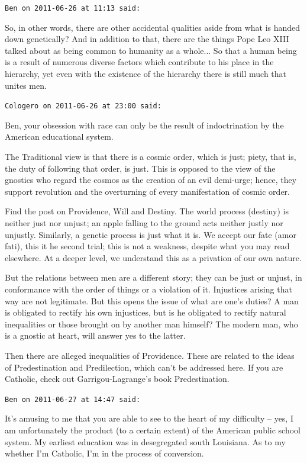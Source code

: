 \begin{footnotesize}
\begin{sffamily}
\texttt{Ben on 2011-06-26 at 11:13 said:}

So, in other words, there are other accidental qualities aside from what is handed down genetically? And in addition to that, there are the things Pope Leo XIII talked about as being common to humanity as a whole... So that a human being is a result of numerous diverse factors which contribute to his place in the hierarchy, yet even with the existence of the hierarchy there is still much that unites men.

\hfill

\texttt{Cologero on 2011-06-26 at 23:00 said:}

Ben, your obsession with race can only be the result of indoctrination by the American educational system.

The Traditional view is that there is a cosmic order, which is just; piety, that is, the duty of following that order, is just. This is opposed to the view of the gnostics who regard the cosmos as the creation of an evil demi-urge; hence, they support revolution and the overturning of every manifestation of cosmic order.

Find the post on Providence, Will and Destiny. The world process (destiny) is neither just nor unjust; an apple falling to the ground acts neither justly nor unjustly. Similarly, a genetic process is just what it is. We accept our fate (amor fati), this it he second trial; this is not a weakness, despite what you may read elsewhere. At a deeper level, we understand this as a privation of our own nature.

But the relations between men are a different story; they can be just or unjust, in conformance with the order of things or a violation of it. Injustices arising that way are not legitimate. But this opens the issue of what are one's duties? A man is obligated to rectify his own injustices, but is he obligated to rectify natural inequalities or those brought on by another man himself? The modern man, who is a gnostic at heart, will answer yes to the latter.

Then there are alleged inequalities of Providence. These are related to the ideas of Predestination and Predilection, which can't be addressed here. If you are Catholic, check out Garrigou-Lagrange's book Predestination.

\hfill

\texttt{Ben on 2011-06-27 at 14:47 said:}

It's amusing to me that you are able to see to the heart of my difficulty -- yes, I am unfortunately the product (to a certain extent) of the American public school system. My earliest education was in desegregated south Louisiana. As to my whether I'm Catholic, I'm in the process of conversion.


\end{sffamily}
\end{footnotesize}
